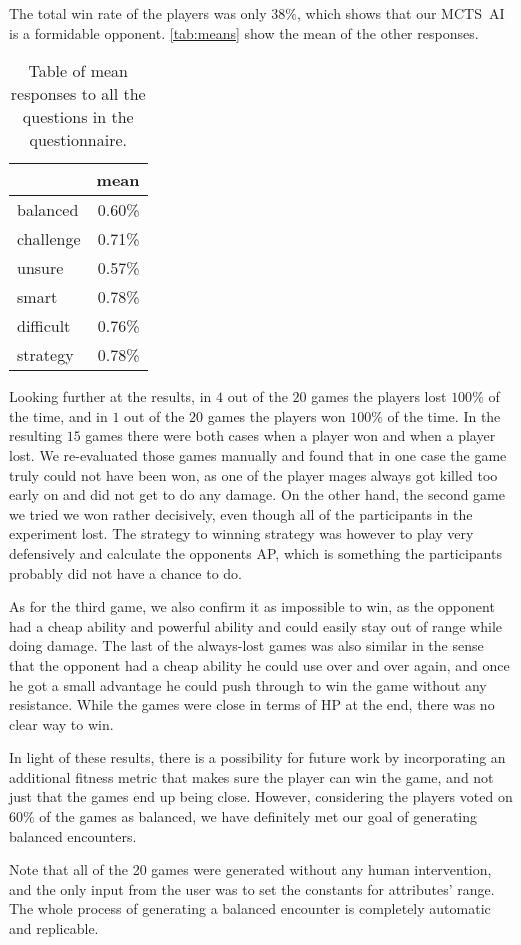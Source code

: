 The total win rate of the players was only $38\%$, which shows that our MCTS~AI
is a formidable opponent. \autoref{tab:means} show the mean of the other responses.

\begin{table}[h!]
	\centering
	\begin{tabular}{lr}
		\toprule
		{} & mean \\ 
		\midrule
		balanced        &       0.60\% \\
		challenge       &       0.71\% \\
		unsure  &       0.57\% \\
		smart   &       0.78\% \\
		difficult       &       0.76\% \\
		strategy        &       0.78\% \\
		\bottomrule
	\end{tabular}
	\caption{Table of mean responses to all the questions in the questionnaire.}
	\label{tab:means}
\end{table}

Looking further at the results, in $4$ out of the $20$ games the players lost $100\%$ of the time,
and in $1$ out of the $20$ games the players won $100\%$ of the time. In the resulting $15$ games
there were both cases when a player won and when a player lost. We re-evaluated those games manually 
and found that in one case the game truly could not have been won, as one of the player mages always
got killed too early on and did not get to do any damage. On the other hand, the second game we tried
we won rather decisively, even though all of the participants in the experiment lost. The strategy to winning
strategy was however to play very defensively and calculate the opponents AP,
which is something the participants probably did not have a chance to do.

As for the third game, we also confirm it as impossible to win, as the opponent had a cheap ability and powerful ability
and could easily stay out of range while doing damage. The last of the always-lost games was also similar
in the sense that the opponent had a cheap ability he could use over and over again, and once he got a small
advantage he could push through to win the game without any resistance. While the games were close in terms
of HP at the end, there was no clear way to win.

In light of these results, there is a possibility for future work by incorporating an additional fitness
metric that makes sure the player can win the game, and not just that the games end up being close. However,
considering the players voted on $60\%$ of the games as balanced, we have definitely met our goal of
generating balanced encounters.

Note that all of the 20 games were generated without any human intervention, and the only input from the user
was to set the constants for attributes' range. The whole process of generating a balanced encounter is completely
automatic and replicable.
